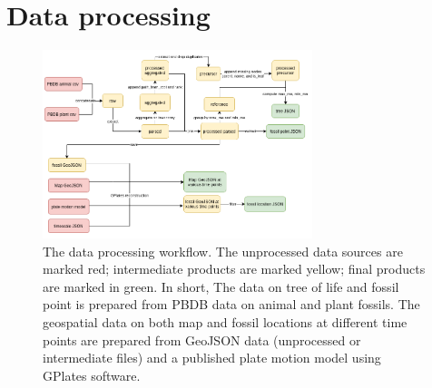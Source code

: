 \documentclass[11pt, a4paper,oneside,chapterprefix=false]{scrbook}
\begin{document}
\section{Data processing}\label{sec:implementation_data_processing}
\begin{figure}[h]
	\centering
	\includegraphics[width=0.7\textwidth]{figures/implementation/data_workflow}
	\caption{The data processing workflow. The unprocessed data sources are marked red; intermediate products are marked yellow; final products are marked in green. In short, The data on tree of life and fossil point is prepared from PBDB data on animal and plant fossils. The geospatial data on both map and fossil locations at different time points are prepared from GeoJSON data (unprocessed or intermediate files) and a published plate motion model using GPlates software. }
	\label{fig:data_workflow}
\end{figure}
\end{document}
